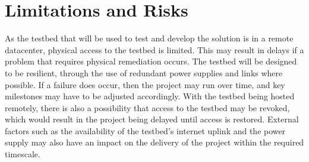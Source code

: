 \section{Limitations and Risks}
\label{intro:constraints}
As the testbed that will be used to test and develop the solution is in a remote datacenter, physical access to the testbed is limited. This may result in delays if a problem that requires physical remediation occurs. The testbed will be designed to be resilient, through the use of redundant power supplies and links where possible. If a failure does occur, then the project may run over time, and key milestones may have to be adjusted accordingly. With the testbed being hosted remotely, there is also a possibility that access to the testbed may be revoked, which would result in the project being delayed until access is restored. External factors such as the availability of the testbed's internet uplink and the power supply may also have an impact on the delivery of the project within the required timescale.